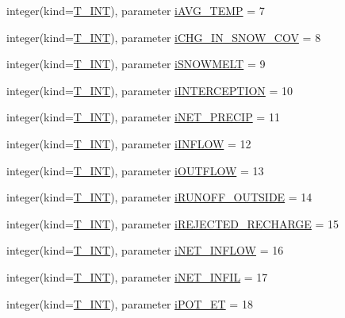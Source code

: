 \begin{DoxyCompactItemize}
\item 
integer(kind=\hyperlink{namespacetypes_a4e4d040a4425196c4d43be63e7e6103a}{T\_\-INT}), parameter \hyperlink{namespacetypes_a11c906ff2073a4fbe3cf9425dce415ae}{iAVG\_\-TEMP} = 7
\item 
integer(kind=\hyperlink{namespacetypes_a4e4d040a4425196c4d43be63e7e6103a}{T\_\-INT}), parameter \hyperlink{namespacetypes_aa1bee1fd3093347686b80dcfe4d610a9}{iCHG\_\-IN\_\-SNOW\_\-COV} = 8
\item 
integer(kind=\hyperlink{namespacetypes_a4e4d040a4425196c4d43be63e7e6103a}{T\_\-INT}), parameter \hyperlink{namespacetypes_a356a0c0b5930e94118b467d1f7b486f2}{iSNOWMELT} = 9
\item 
integer(kind=\hyperlink{namespacetypes_a4e4d040a4425196c4d43be63e7e6103a}{T\_\-INT}), parameter \hyperlink{namespacetypes_abbe2d030deced65481aa7f6447173269}{iINTERCEPTION} = 10
\item 
integer(kind=\hyperlink{namespacetypes_a4e4d040a4425196c4d43be63e7e6103a}{T\_\-INT}), parameter \hyperlink{namespacetypes_a5f9046fed07889a2ac6a854e9563e96a}{iNET\_\-PRECIP} = 11
\item 
integer(kind=\hyperlink{namespacetypes_a4e4d040a4425196c4d43be63e7e6103a}{T\_\-INT}), parameter \hyperlink{namespacetypes_a76a571421076f0030f2ecf4ab852504d}{iINFLOW} = 12
\item 
integer(kind=\hyperlink{namespacetypes_a4e4d040a4425196c4d43be63e7e6103a}{T\_\-INT}), parameter \hyperlink{namespacetypes_ad2090785f42112bf8cf46d637279bc2c}{iOUTFLOW} = 13
\item 
integer(kind=\hyperlink{namespacetypes_a4e4d040a4425196c4d43be63e7e6103a}{T\_\-INT}), parameter \hyperlink{namespacetypes_aab5c72102086046b4f2dbaab08ccb75b}{iRUNOFF\_\-OUTSIDE} = 14
\item 
integer(kind=\hyperlink{namespacetypes_a4e4d040a4425196c4d43be63e7e6103a}{T\_\-INT}), parameter \hyperlink{namespacetypes_ae14eacf3547df95bf9f8678645f92a42}{iREJECTED\_\-RECHARGE} = 15
\item 
integer(kind=\hyperlink{namespacetypes_a4e4d040a4425196c4d43be63e7e6103a}{T\_\-INT}), parameter \hyperlink{namespacetypes_a42742629ae90d31afa09e1250d647875}{iNET\_\-INFLOW} = 16
\item 
integer(kind=\hyperlink{namespacetypes_a4e4d040a4425196c4d43be63e7e6103a}{T\_\-INT}), parameter \hyperlink{namespacetypes_a6c9ee6a446b45c2636429fb1dabdad33}{iNET\_\-INFIL} = 17
\item 
integer(kind=\hyperlink{namespacetypes_a4e4d040a4425196c4d43be63e7e6103a}{T\_\-INT}), parameter \hyperlink{namespacetypes_a5c8388d67ca88816f13bf84e0247c604}{iPOT\_\-ET} = 18

\end{DoxyCompactItemize}
